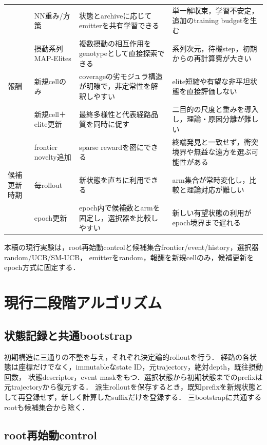 \documentclass[a4paper,11pt]{ltjsarticle}
\begin{document}
\begin{longtable}{p{19mm}p{29mm}p{46mm}p{46mm}}
& NN重み/方策 & 状態とarchiveに応じてemitterを共有学習できる & 単一解収束，学習不安定，追加のtraining budgetを生む\\
& 摂動系列MAP-Elites & 複数摂動の相互作用をgenotypeとして直接探索できる & 系列次元，待機step，初期からの再計算費が大きい\\
\midrule
報酬 & 新規cellのみ & coverageの劣モジュラ構造が明瞭で，非定常性を解釈しやすい & elite短縮や有望な非平坦状態を直接評価しない\\
& 新規cell＋elite更新 & 最終多様性と代表経路品質を同時に促す & 二目的の尺度と重みを導入し，理論・原因分離が難しい\\
& frontier novelty追加 & sparse rewardを密にできる & 終端発見と一致せず，衝突境界や無益な遠方を選ぶ可能性がある\\
\midrule
候補更新時期 & 毎rollout & 新状態を直ちに利用できる & arm集合が常時変化し，比較と理論対応が難しい\\
& epoch更新 & epoch内で候補数とarmを固定し，選択器を比較しやすい & 新しい有望状態の利用がepoch境界まで遅れる\\
\bottomrule
\end{longtable}
\normalsize

本稿の現行実験は，root再始動controlと候補集合frontier/event/history，選択器random/UCB/SM-UCB，
emitterをrandom，報酬を新規cellのみ，候補更新をepoch方式に固定する．

\section{現行二段階アルゴリズム}
\label{sec:protocol}

\subsection{状態記録と共通bootstrap}

初期構造に三通りの不整を与え，それぞれ決定論的rolloutを行う．
経路の各状態は座標だけでなく，immutableなstate ID，元trajectory，絶対depth，既往摂動回数，
状態descriptor，event maskをもつ．選択状態から初期状態までのprefixは元trajectoryから復元する．
派生rolloutを保存するとき，既知prefixを新規状態として再登録せず，新しく計算したsuffixだけを登録する．
三bootstrapに共通するrootも候補集合から除く．


\subsection{root再始動control}
\end{document}

